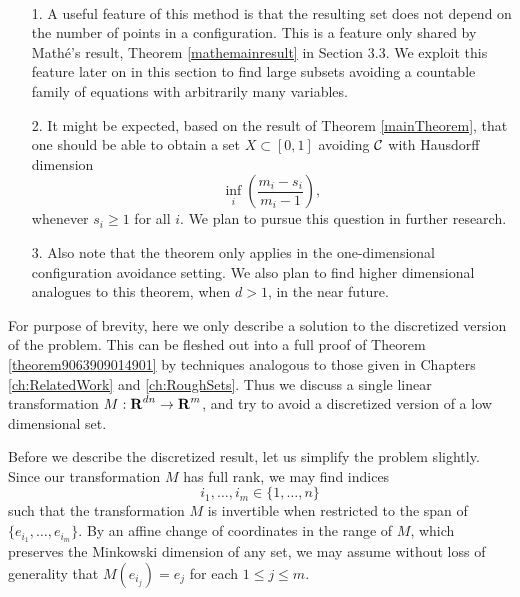 \begin{remarks}
    \
    \begin{enumerate}
        \item[1.] A useful feature of this method is that the resulting set does not depend on the number of points in a configuration. This is a feature only shared by Math\'{e}'s result, Theorem \ref{mathemainresult} in Section 3.3. We exploit this feature later on in this section to find large subsets avoiding a countable family of equations with arbitrarily many variables.

        \item[2.] It might be expected, based on the result of Theorem \ref{mainTheorem}, that one should be able to obtain a set $X \subset [0,1]$ avoiding $\operatorname{\mathcal{C}}$ with Hausdorff dimension
        \[ \inf_i \left( \frac{m_i - s_i}{m_i - 1} \right), \]
        whenever $s_i \geq 1$ for all $i$. We plan to pursue this question in further research.

        \item[3.] Also note that the theorem only applies in the one-dimensional configuration avoidance setting. We also plan to find higher dimensional analogues to this theorem, when $d > 1$, in the near future.
    \end{enumerate}
\end{remarks}

For purpose of brevity, here we only describe a solution to the discretized version of the problem. This can be fleshed out into a full proof of Theorem \ref{theorem9063909014901} by techniques analogous to those given in Chapters \ref{ch:RelatedWork} and \ref{ch:RoughSets}. Thus we discuss a single linear transformation $M: \operatorname{\mathbf{R}}^{dn} \to \operatorname{\mathbf{R}}^m$, and try to avoid a discretized version of a low dimensional set.

Before we describe the discretized result, let us simplify the problem slightly. Since our transformation $M$ has full rank, we may find indices
%
\[ i_1, \dots, i_m \in \{ 1, \dots, n \} \]
%
such that the transformation $M$ is invertible when restricted to the span of $\{ e_{i_1}, \dots, e_{i_m} \}$. By an affine change of coordinates in the range of $M$, which preserves the Minkowski dimension of any set, we may assume without loss of generality that $M(e_{i_j}) = e_j$ for each $1 \leq j \leq m$.

